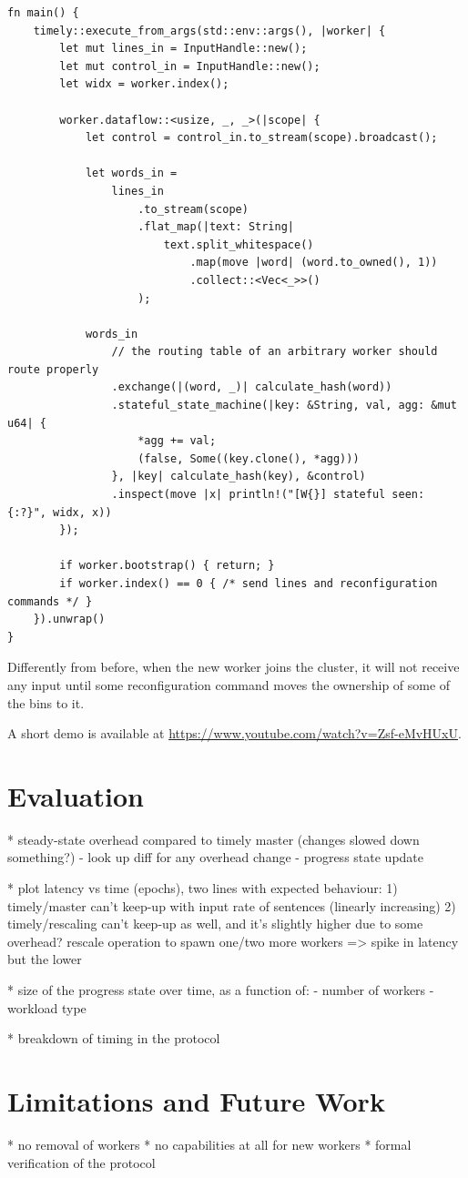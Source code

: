 \documentclass[12pt]{extarticle}
\begin{document}
\begin{verbatim}
fn main() {
    timely::execute_from_args(std::env::args(), |worker| {
        let mut lines_in = InputHandle::new();
        let mut control_in = InputHandle::new();
        let widx = worker.index();

        worker.dataflow::<usize, _, _>(|scope| {
            let control = control_in.to_stream(scope).broadcast();

            let words_in =
                lines_in
                    .to_stream(scope)
                    .flat_map(|text: String|
                        text.split_whitespace()
                            .map(move |word| (word.to_owned(), 1))
                            .collect::<Vec<_>>()
                    );

            words_in
                // the routing table of an arbitrary worker should route properly
                .exchange(|(word, _)| calculate_hash(word))
                .stateful_state_machine(|key: &String, val, agg: &mut u64| {
                    *agg += val;
                    (false, Some((key.clone(), *agg)))
                }, |key| calculate_hash(key), &control)
                .inspect(move |x| println!("[W{}] stateful seen: {:?}", widx, x))
        });

        if worker.bootstrap() { return; }
        if worker.index() == 0 { /* send lines and reconfiguration commands */ }
    }).unwrap()
}
\end{verbatim}


Differently from before, when the new worker joins the cluster, it will not receive any input until
some reconfiguration command moves the ownership of some of the bins to it.

A short demo is available at \url{https://www.youtube.com/watch?v=Zsf-eMvHUxU}.



\section{Evaluation}

* steady-state overhead compared to timely master (changes slowed down something?)
   - look up diff for any overhead change
   - progress state update

* plot latency vs time (epochs), two lines with expected behaviour:
    1) timely/master can't keep-up with input rate of sentences (linearly increasing)
    2) timely/rescaling can't keep-up as well, and it's slightly higher due to some overhead?
       rescale operation to spawn one/two more workers => spike in latency but the lower

* size of the progress state over time, as a function of:
  - number of workers
  - workload type

* breakdown of timing in the protocol

\section{Limitations and Future Work}

* no removal of workers
* no capabilities at all for new workers
* formal verification of the protocol
\end{document}
